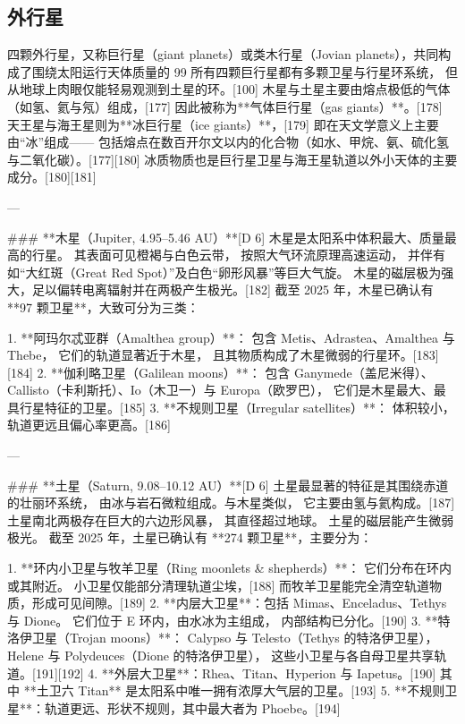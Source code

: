 \subsection{外行星}

四颗外行星，又称巨行星（giant planets）或类木行星（Jovian planets），共同构成了围绕太阳运行天体质量的 99%
所有四颗巨行星都有多颗卫星与行星环系统，  
但从地球上肉眼仅能轻易观测到土星的环。[100]  
木星与土星主要由熔点极低的气体（如氢、氦与氖）组成，[177]  
因此被称为**气体巨行星（gas giants）**。[178]  
天王星与海王星则为**冰巨行星（ice giants）**，[179]  
即在天文学意义上主要由“冰”组成——  
包括熔点在数百开尔文以内的化合物（如水、甲烷、氨、硫化氢与二氧化碳）。[177][180]  
冰质物质也是巨行星卫星与海王星轨道以外小天体的主要成分。[180][181]  

---

### **木星（Jupiter, 4.95–5.46 AU）**[D 6]  
木星是太阳系中体积最大、质量最高的行星。  
其表面可见橙褐与白色云带，  
按照大气环流原理高速运动，  
并伴有如“大红斑（Great Red Spot）”及白色“卵形风暴”等巨大气旋。  
木星的磁层极为强大，足以偏转电离辐射并在两极产生极光。[182]  
截至 2025 年，木星已确认有 **97 颗卫星**，大致可分为三类：  

1. **阿玛尔忒亚群（Amalthea group）**：  
   包含 Metis、Adrastea、Amalthea 与 Thebe，  
   它们的轨道显著近于木星，  
   且其物质构成了木星微弱的行星环。[183][184]  
2. **伽利略卫星（Galilean moons）**：  
   包含 Ganymede（盖尼米得）、Callisto（卡利斯托）、Io（木卫一）与 Europa（欧罗巴），  
   它们是木星最大、最具行星特征的卫星。[185]  
3. **不规则卫星（Irregular satellites）**：  
   体积较小，轨道更远且偏心率更高。[186]  

---

### **土星（Saturn, 9.08–10.12 AU）**[D 6]  
土星最显著的特征是其围绕赤道的壮丽环系统，  
由冰与岩石微粒组成。与木星类似，  
它主要由氢与氦构成。[187]  
土星南北两极存在巨大的六边形风暴，  
其直径超过地球。  
土星的磁层能产生微弱极光。  
截至 2025 年，土星已确认有 **274 颗卫星**，主要分为：  

1. **环内小卫星与牧羊卫星（Ring moonlets & shepherds）**：  
   它们分布在环内或其附近。  
   小卫星仅能部分清理轨道尘埃，[188]  
   而牧羊卫星能完全清空轨道物质，形成可见间隙。[189]  
2. **内层大卫星**：包括 Mimas、Enceladus、Tethys 与 Dione。  
   它们位于 E 环内，由水冰为主组成，  
   内部结构已分化。[190]  
3. **特洛伊卫星（Trojan moons）**：  
   Calypso 与 Telesto（Tethys 的特洛伊卫星），  
   Helene 与 Polydeuces（Dione 的特洛伊卫星），  
   这些小卫星与各自母卫星共享轨道。[191][192]  
4. **外层大卫星**：Rhea、Titan、Hyperion 与 Iapetus。[190]  
   其中 **土卫六 Titan** 是太阳系中唯一拥有浓厚大气层的卫星。[193]  
5. **不规则卫星**：轨道更远、形状不规则，其中最大者为 Phoebe。[194]  

